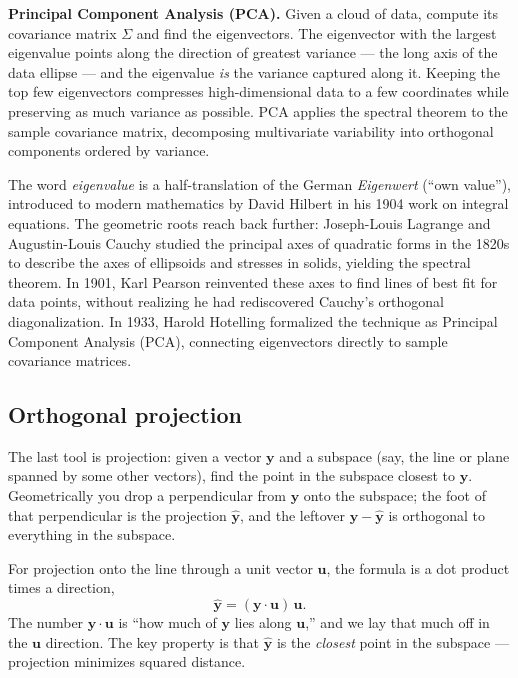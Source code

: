 \begin{applicationbox}
\textbf{Principal Component Analysis (PCA).} Given a cloud of data, compute its covariance matrix
$\Sigma$ and find the eigenvectors. The eigenvector with the largest eigenvalue points along the
direction of greatest variance --- the long axis of the data ellipse --- and the eigenvalue \emph{is}
the variance captured along it. Keeping the top few eigenvectors compresses high-dimensional data to a
few coordinates while preserving as much variance as possible. PCA applies the
spectral theorem to the sample covariance matrix, decomposing multivariate variability
into orthogonal components ordered by variance.
\end{applicationbox}

\begin{historybox}
The word \emph{eigenvalue} is a half-translation of the German \emph{Eigenwert}
(``own value''), introduced to modern mathematics by David Hilbert in his 1904
work on integral equations. The geometric roots reach back further:
Joseph-Louis Lagrange and Augustin-Louis Cauchy studied the principal axes of
quadratic forms in the 1820s to describe the axes of ellipsoids and stresses in
solids, yielding the spectral theorem. In 1901, Karl Pearson reinvented these
axes to find lines of best fit for data points, without realizing he had
rediscovered Cauchy's orthogonal diagonalization. In 1933, Harold Hotelling
formalized the technique as Principal Component Analysis (PCA), connecting
eigenvectors directly to sample covariance matrices.
\end{historybox}

\subsection{Orthogonal projection}
\label{chAcla:projection}

The last tool is projection: given a vector $\mathbf{y}$ and a subspace (say, the line or plane
spanned by some other vectors), find the point in the subspace closest to $\mathbf{y}$. Geometrically
you drop a perpendicular from $\mathbf{y}$ onto the subspace; the foot of that perpendicular is the
projection $\hat{\mathbf{y}}$, and the leftover $\mathbf{y}-\hat{\mathbf{y}}$ is orthogonal to
everything in the subspace.

For projection onto the line through a unit vector $\mathbf{u}$, the formula is a dot product
times a direction,
\[
  \hat{\mathbf{y}} = (\mathbf{y}\cdot\mathbf{u})\,\mathbf{u}.
\]
The number $\mathbf{y}\cdot\mathbf{u}$ is ``how much of $\mathbf{y}$ lies along $\mathbf{u}$,'' and we
lay that much off in the $\mathbf{u}$ direction. The key property is that $\hat{\mathbf{y}}$ is the
\emph{closest} point in the subspace --- projection minimizes squared distance.

